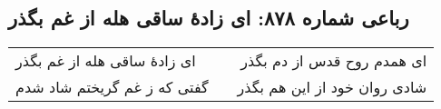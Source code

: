 \begin{center}
\section*{رباعی شماره ۸۷۸: ای زادهٔ ساقی هله از غم بگذر}
\label{sec:0878}
\begin{longtable}{l p{0.5cm} r}
ای زادهٔ ساقی هله از غم بگذر
&&
ای همدم روح قدس از دم بگذر
\\
گفتی که ز غم گریختم شاد شدم
&&
شادی روان خود از این هم بگذر
\\
\end{longtable}
\end{center}
